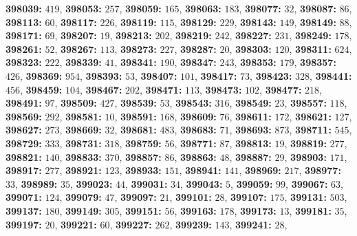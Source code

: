 \textsf{\bfseries 398039:} $419$, \textsf{\bfseries 398053:} $257$, \textsf{\bfseries 398059:} $165$, \textsf{\bfseries 398063:} $183$, \textsf{\bfseries 398077:} $32$, \textsf{\bfseries 398087:} $86$, \textsf{\bfseries 398113:} $60$, \textsf{\bfseries 398117:} $226$, \textsf{\bfseries 398119:} $115$, \textsf{\bfseries 398129:} $229$, \textsf{\bfseries 398143:} $149$, \textsf{\bfseries 398149:} $88$, \textsf{\bfseries 398171:} $69$, \textsf{\bfseries 398207:} $19$, \textsf{\bfseries 398213:} $202$, \textsf{\bfseries 398219:} $242$, \textsf{\bfseries 398227:} $231$, \textsf{\bfseries 398249:} $178$, \textsf{\bfseries 398261:} $52$, \textsf{\bfseries 398267:} $113$, \textsf{\bfseries 398273:} $227$, \textsf{\bfseries 398287:} $20$, \textsf{\bfseries 398303:} $120$, \textsf{\bfseries 398311:} $624$, \textsf{\bfseries 398323:} $222$, \textsf{\bfseries 398339:} $41$, \textsf{\bfseries 398341:} $190$, \textsf{\bfseries 398347:} $243$, \textsf{\bfseries 398353:} $179$, \textsf{\bfseries 398357:} $426$, \textsf{\bfseries 398369:} $954$, \textsf{\bfseries 398393:} $53$, \textsf{\bfseries 398407:} $101$, \textsf{\bfseries 398417:} $73$, \textsf{\bfseries 398423:} $328$, \textsf{\bfseries 398441:} $456$, \textsf{\bfseries 398459:} $104$, \textsf{\bfseries 398467:} $202$, \textsf{\bfseries 398471:} $113$, \textsf{\bfseries 398473:} $102$, \textsf{\bfseries 398477:} $218$, \textsf{\bfseries 398491:} $97$, \textsf{\bfseries 398509:} $427$, \textsf{\bfseries 398539:} $53$, \textsf{\bfseries 398543:} $316$, \textsf{\bfseries 398549:} $23$, \textsf{\bfseries 398557:} $118$, \textsf{\bfseries 398569:} $292$, \textsf{\bfseries 398581:} $10$, \textsf{\bfseries 398591:} $168$, \textsf{\bfseries 398609:} $76$, \textsf{\bfseries 398611:} $172$, \textsf{\bfseries 398621:} $127$, \textsf{\bfseries 398627:} $273$, \textsf{\bfseries 398669:} $32$, \textsf{\bfseries 398681:} $483$, \textsf{\bfseries 398683:} $71$, \textsf{\bfseries 398693:} $873$, \textsf{\bfseries 398711:} $545$, \textsf{\bfseries 398729:} $333$, \textsf{\bfseries 398731:} $318$, \textsf{\bfseries 398759:} $56$, \textsf{\bfseries 398771:} $87$, \textsf{\bfseries 398813:} $19$, \textsf{\bfseries 398819:} $277$, \textsf{\bfseries 398821:} $140$, \textsf{\bfseries 398833:} $370$, \textsf{\bfseries 398857:} $86$, \textsf{\bfseries 398863:} $48$, \textsf{\bfseries 398887:} $29$, \textsf{\bfseries 398903:} $171$, \textsf{\bfseries 398917:} $277$, \textsf{\bfseries 398921:} $123$, \textsf{\bfseries 398933:} $151$, \textsf{\bfseries 398941:} $141$, \textsf{\bfseries 398969:} $217$, \textsf{\bfseries 398977:} $33$, \textsf{\bfseries 398989:} $35$, \textsf{\bfseries 399023:} $44$, \textsf{\bfseries 399031:} $34$, \textsf{\bfseries 399043:} $5$, \textsf{\bfseries 399059:} $99$, \textsf{\bfseries 399067:} $63$, \textsf{\bfseries 399071:} $124$, \textsf{\bfseries 399079:} $47$, \textsf{\bfseries 399097:} $21$, \textsf{\bfseries 399101:} $28$, \textsf{\bfseries 399107:} $175$, \textsf{\bfseries 399131:} $503$, \textsf{\bfseries 399137:} $180$, \textsf{\bfseries 399149:} $305$, \textsf{\bfseries 399151:} $56$, \textsf{\bfseries 399163:} $178$, \textsf{\bfseries 399173:} $13$, \textsf{\bfseries 399181:} $35$, \textsf{\bfseries 399197:} $20$, \textsf{\bfseries 399221:} $60$, \textsf{\bfseries 399227:} $262$, \textsf{\bfseries 399239:} $143$, \textsf{\bfseries 399241:} $28$, 
